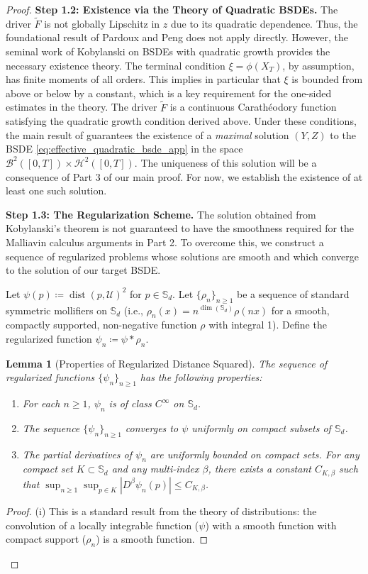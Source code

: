 \documentclass[12pt, letterpaper]{amsart}
\newcommand{\Ucal}{\mathcal{U}}
\newcommand{\Bcal}{\mathcal{B}}
\newcommand{\Hcal}{\mathcal{H}}
\newcommand{\Sd}{\mathbb{S}_d}
\newcommand{\abs}[1]{\left\lvert#1\right\rvert}
\DeclareMathOperator*{\dist}{dist}
\theoremstyle{plain}
\newtheorem{lemma}[theorem]{Lemma}
\theoremstyle{definition}
\theoremstyle{remark}
\numberwithin{equation}{section} %
\begin{document}
\begin{proof}
\vspace{1ex}
\noindent\textbf{Step 1.2: Existence via the Theory of Quadratic BSDEs.}
The driver \(\tilde{F}\) is not globally Lipschitz in \(z\) due to its quadratic dependence. Thus, the foundational result of Pardoux and Peng \cite{PardouxPeng1990} does not apply directly. However, the seminal work of Kobylanski \cite{Kobylanski2000} on BSDEs with quadratic growth provides the necessary existence theory.
The terminal condition \(\xi = \phi(X_T)\), by assumption, has finite moments of all orders. This implies in particular that \(\xi\) is bounded from above or below by a constant, which is a key requirement for the one-sided estimates in the theory. The driver \(\tilde{F}\) is a continuous Carathéodory function satisfying the quadratic growth condition derived above. Under these conditions, the main result of \cite[Theorem 2.3]{Kobylanski2000} guarantees the existence of a \emph{maximal} solution \((Y,Z)\) to the BSDE \eqref{eq:effective_quadratic_bsde_app} in the space \(\Bcal^2([0,T]) \times \Hcal^2([0,T])\). The uniqueness of this solution will be a consequence of Part 3 of our main proof. For now, we establish the existence of at least one such solution.

\vspace{1ex}
\noindent\textbf{Step 1.3: The Regularization Scheme.}
The solution obtained from Kobylanski's theorem is not guaranteed to have the smoothness required for the Malliavin calculus arguments in Part 2. To overcome this, we construct a sequence of regularized problems whose solutions are smooth and which converge to the solution of our target BSDE.

Let \(\psi(p) \coloneqq \dist(p, \Ucal)^2\) for \(p \in \Sd\). Let \(\{\rho_n\}_{n\ge 1}\) be a sequence of standard symmetric mollifiers on \(\Sd\) (i.e., $\rho_n(x)=n^{\dim(\Sd)}\rho(nx)$ for a smooth, compactly supported, non-negative function $\rho$ with integral 1). Define the regularized function \(\psi_n \coloneqq \psi * \rho_n\).

\begin{lemma}[Properties of Regularized Distance Squared]
The sequence of regularized functions $\{\psi_n\}_{n\ge 1}$ has the following properties:
\begin{enumerate}[label=(\roman*)]
    \item For each \(n \ge 1\), \(\psi_n\) is of class \(C^\infty\) on \(\Sd\).
    \item The sequence \(\{\psi_n\}_{n\ge 1}\) converges to \(\psi\) uniformly on compact subsets of \(\Sd\).
    \item The partial derivatives of \(\psi_n\) are uniformly bounded on compact sets. For any compact set \(K \subset \Sd\) and any multi-index \(\beta\), there exists a constant \(C_{K,\beta}\) such that \(\sup_{n\ge 1}\sup_{p\in K} \abs{D^\beta \psi_n(p)} \le C_{K,\beta}\).
\end{enumerate}
\end{lemma}
\begin{proof}
(i) This is a standard result from the theory of distributions: the convolution of a locally integrable function ($\psi$) with a smooth function with compact support ($\rho_n$) is a smooth function.


\end{proof}
\end{proof}
\end{document}
